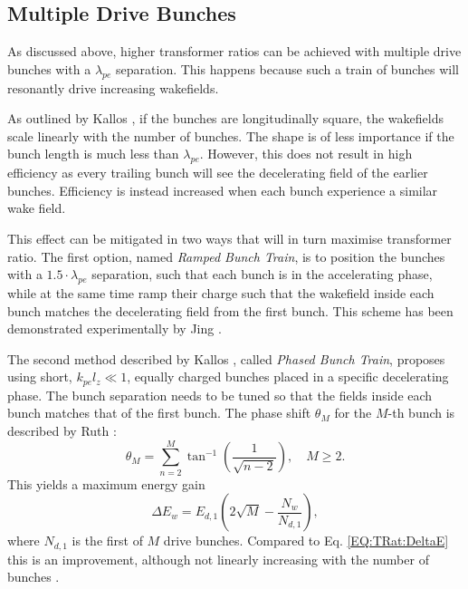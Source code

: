 \subsection{Multiple Drive Bunches}
\label{Int:BPI:Multi}

As discussed above, higher transformer ratios can be achieved with multiple drive bunches with a $\lambda_{pe}$ separation. This happens because such a train of bunches will resonantly drive increasing wakefields.

As outlined by Kallos \etal \cite{kallos:2007}, if the bunches are longitudinally square, the wakefields scale linearly with the number of bunches. The shape is of less importance if the bunch length is much less than $\lambda_{pe}$. However, this does not result in high efficiency as every trailing bunch will see the decelerating field of the earlier bunches. Efficiency is instead increased when each bunch experience a similar wake field.

This effect can be mitigated in two ways that will in turn maximise transformer ratio. The first option, named \textit{Ramped Bunch Train}, is to position the bunches with a $1.5\cdot\lambda_{pe}$ separation, such that each bunch is in the accelerating phase, while at the same time ramp their charge such that the wakefield inside each bunch matches the decelerating field from the first bunch. This scheme has been demonstrated experimentally by Jing \etal \cite{jing:2006,jing:2007}.

The second method described by Kallos \etal, called \textit{Phased Bunch Train}, proposes using short, $k_{pe}l_{z} \ll 1$, equally charged bunches placed in a specific decelerating phase. The bunch separation needs to be tuned so that the fields inside each bunch matches that of the first bunch. The phase shift $\theta_{M}$ for the $M$-th bunch is described by Ruth \etal \cite{ruth:1985}:
\begin{equation}
    \theta_{M} = \sum^{M}_{n=2}\tan^{-1}\left(\frac{1}{\sqrt{n-2}}\right),\quad M \geq 2. \label{EQ:TrainPhase}
\end{equation}
This yields a maximum energy gain
\begin{equation}
    \Delta E_{w} = E_{d,1}\left(2\sqrt{M}-\frac{N_{w}}{N_{d,1}}\right), \label{EQ:TrainPhaseMaxE}
\end{equation}
where $N_{d,1}$ is the first of $M$ drive bunches. Compared to Eq. \ref{EQ:TRat:DeltaE} this is an improvement, although not linearly increasing with the number of bunches \cite{ruth:1985}.

